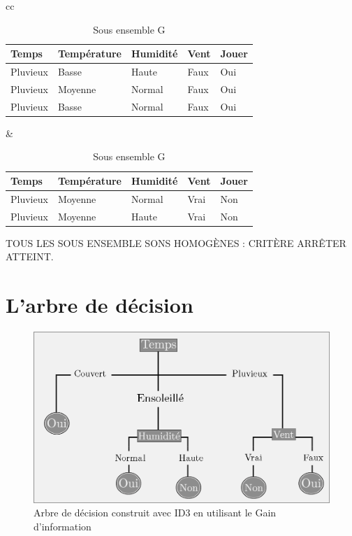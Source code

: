 \documentclass[a4paper, 11pt]{report}
\begin{document}
\begin{itemize}
\begin{itemize}
\begin{table}[!h]
\begin{small}
\begin{tabular}{cc}
\begin{minipage}{.5\linewidth}
\begin{tabular}{| l | l | l | l | l |}
\hline
Temps & Température & Humidité & Vent & Jouer \\
\hline
Pluvieux & Basse & Haute & Faux & \cellcolor{yellow}Oui \\
\hline
Pluvieux & Moyenne & Normal & Faux & \cellcolor{yellow}Oui \\
\hline
Pluvieux & Basse & Normal & Faux &  \cellcolor{yellow}Oui \\
\hline
\end{tabular} 


      \caption{Sous ensemble F}

    \end{minipage} &

    \begin{minipage}{.5\linewidth}

\begin{tabular}{| l | l | l | l | l |}
\hline
Temps & Température & Humidité & Vent & Jouer \\
\hline
Pluvieux & Moyenne & Normal & Vrai &  \cellcolor{green}Non \\
\hline
Pluvieux & Moyenne & Haute & Vrai &  \cellcolor{green}Non \\
\hline
\end{tabular} 
      \caption{Sous ensemble G}
    \end{minipage} 
\end{tabular}
\end{small}
\end{table}
\end{itemize}

TOUS LES SOUS ENSEMBLE SONS HOMOGÈNES : CRITÈRE ARRÊTER ATTEINT.
\end{itemize}
\newpage
\section{L'arbre de décision}
\begin{figure}[!h]
\begin{center}
\includegraphics[scale=3]{figure_GI}
\caption{Arbre de décision construit avec ID3 en utilisant le Gain d'information}
\end{center}
\end{figure}
\end{document}
